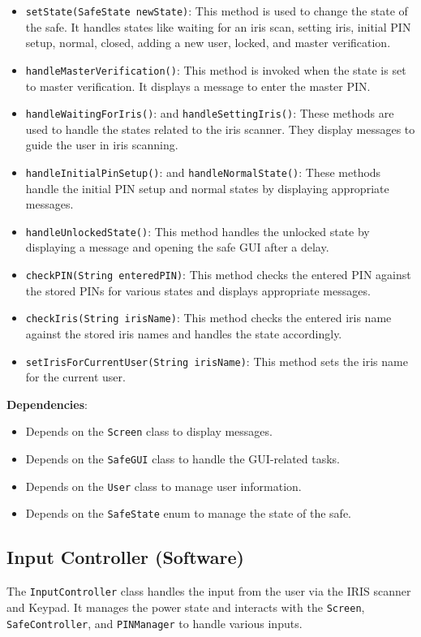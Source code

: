 \documentclass{article}
\begin{document}
\begin{itemize}
    \item \texttt{setState(SafeState newState)}: This method is used to change the state of the safe. It handles states like waiting for an iris scan, setting iris, initial PIN setup, normal, closed, adding a new user, locked, and master verification.
    \item \texttt{handleMasterVerification()}: This method is invoked when the state is set to master verification. It displays a message to enter the master PIN.
    \item \texttt{handleWaitingForIris()}: and \texttt{handleSettingIris()}: These methods are used to handle the states related to the iris scanner. They display messages to guide the user in iris scanning.
    \item \texttt{handleInitialPinSetup()}: and \texttt{handleNormalState()}: These methods handle the initial PIN setup and normal states by displaying appropriate messages.
    \item \texttt{handleUnlockedState()}: This method handles the unlocked state by displaying a message and opening the safe GUI after a delay.
    \item \texttt{checkPIN(String enteredPIN)}: This method checks the entered PIN against the stored PINs for various states and displays appropriate messages.
    \item \texttt{checkIris(String irisName)}: This method checks the entered iris name against the stored iris names and handles the state accordingly.
    \item \texttt{setIrisForCurrentUser(String irisName)}: This method sets the iris name for the current user.
\end{itemize}
\textbf{Dependencies}:
\begin{itemize}
    \item Depends on the \texttt{Screen} class to display messages.
    \item Depends on the \texttt{SafeGUI} class to handle the GUI-related tasks.
    \item Depends on the \texttt{User} class to manage user information.
    \item Depends on the \texttt{SafeState} enum to manage the state of the safe.
\end{itemize}

\subsection{Input Controller (Software)}
The \texttt{InputController} class handles the input from the user via the IRIS scanner and Keypad. It manages the power state and interacts with the \texttt{Screen}, \texttt{SafeController}, and \texttt{PINManager} to handle various inputs.
\end{document}
